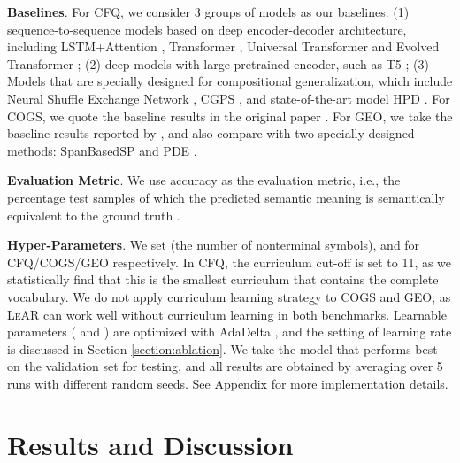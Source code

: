 \documentclass[11pt,a4paper]{article}
\begin{document}
\noindent \textbf{Baselines}.
For CFQ, we consider 3 groups of models as our baselines:
(1) sequence-to-sequence models based on deep encoder-decoder architecture, including LSTM+Attention \cite{hochreiter1997long, bahdanau2014neural}, Transformer \cite{vaswani2017attention}, Universal Transformer \cite{dehghani2018universal} and Evolved Transformer \cite{so2019evolved};
(2) deep models with large pretrained encoder, such as T5 \cite{raffel2019exploring};
(3) Models that are specially designed for compositional generalization, which include Neural Shuffle Exchange Network \cite{freivalds2019neural}, CGPS \cite{li2019compositional}, and state-of-the-art model HPD \cite{guo2020hierarchical}.
For COGS, we quote the baseline results in the original paper \cite{kim2020cogs}.
For GEO, we take the baseline results reported by \citet{herzig2020span-csp}, and also compare with two specially designed methods: SpanBasedSP \cite{herzig2020span-csp} and PDE \cite{guo2020geoiterative}.

\noindent \textbf{Evaluation Metric}.
We use accuracy as the evaluation metric, i.e., the percentage test samples of which the predicted semantic meaning  is semantically equivalent to the ground truth .

\noindent \textbf{Hyper-Parameters}.
We set  (the number of nonterminal symbols), and  for CFQ/COGS/GEO respectively.
In CFQ, the curriculum cut-off  is set to 11, as we statistically find that this is the smallest curriculum that contains the complete vocabulary.
We do not apply curriculum learning strategy to COGS and GEO, as \textsc{LeAR} can work well without curriculum learning in both benchmarks.
Learnable parameters ( and ) are optimized with AdaDelta \cite{adadelta_2012-apd}, and the setting of learning rate is discussed in Section \ref{section:ablation}.
We take the model that performs best on the validation set for testing, and all results are obtained by averaging over 5 runs with different random seeds.
See Appendix for more implementation details.

\section{Results and Discussion}
\end{document}
